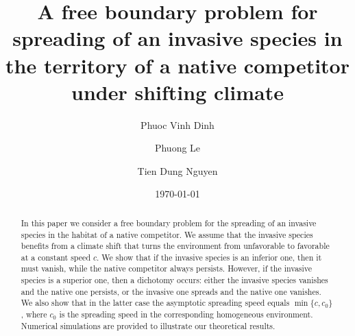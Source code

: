 \documentclass[reqno]{amsart}
\theoremstyle{plain}
\theoremstyle{definition}
\theoremstyle{remark}
\begin{document}
	
	\author{Phuoc Vinh Dinh}
	\address{Phuoc Vinh Dinh$^{1,2,3}$ (ORCID: 0009-0000-6297-7798)\newline
		$^1$Faculty of Applied Sciences, Ho Chi Minh City University of Technology (HCMUT), 268 Ly Thuong Kiet Street, Dien Hong Ward, Ho Chi Minh City, Vietnam;\newline
		$^2$Vietnam National University, Ho Chi Minh City, Vietnam\newline
		$^3$Department of Mathematics, FPT University, Ho Chi Minh City, Vietnam}
	
	\author{Phuong Le}
	\address{Phuong Le$^{4,2}$ (ORCID: 0000-0003-4724-7118)\newline
		$^4$Faculty of Economic Mathematics, University of Economics and Law, Ho Chi Minh City, Vietnam; \newline
		$^2$Vietnam National University, Ho Chi Minh City, Vietnam}
	
	\author{Tien Dung Nguyen}
	\address{Tien Dung Nguyen$^{1,2}$\newline
		$^1$Faculty of Applied Sciences, Ho Chi Minh City University of Technology (HCMUT), 268 Ly Thuong Kiet Street, Dien Hong Ward, Ho Chi Minh City, Vietnam;\newline
		$^2$Vietnam National University, Ho Chi Minh City, Vietnam}
	
	
	\title[A free boundary problem for spreading of an invasive species]{A free boundary problem for spreading of an invasive species in the territory of a native competitor under shifting climate}
	
	
	\date{\today}
	
	
	\begin{abstract}
		In this paper we consider a free boundary problem for the spreading of an invasive species in the habitat of a native competitor. We assume that the invasive species benefits from a climate shift that turns the environment from unfavorable to favorable at a constant speed $c$. We show that if the invasive species is an inferior one, then it must vanish, while the native competitor always persists. However, if the invasive species is a superior one, then a dichotomy occurs: either the invasive species vanishes and the native one persists, or the invasive one spreads and the native one vanishes. We also show that in the latter case the asymptotic spreading speed equals $\min\{c, c_0\}$, where $c_0$ is the spreading speed in the corresponding homogeneous environment. Numerical simulations are provided to illustrate our theoretical results.
	\end{abstract} 
	
\end{document}
